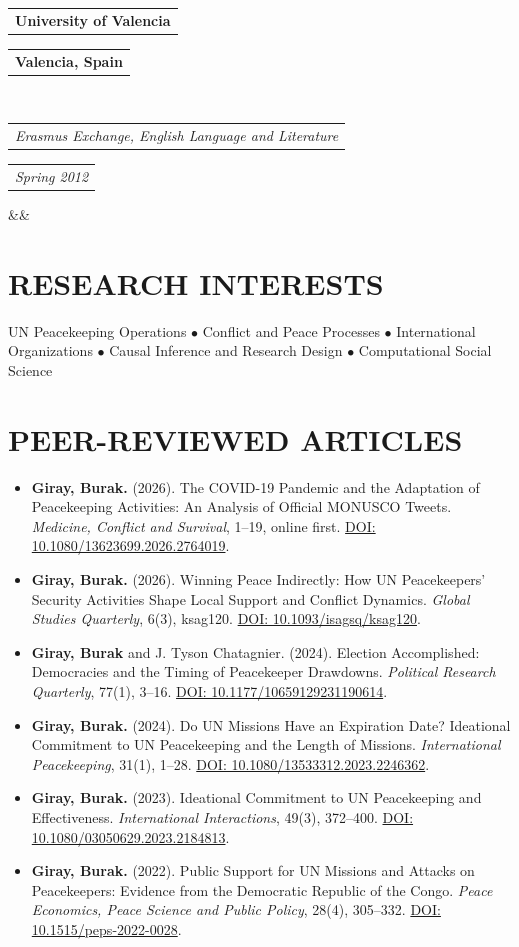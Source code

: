 \documentclass[11pt,a4paper,roman]{moderncv}
\makeatletter
\newcommand*{\customcventry}[7][.25em]{%
  \begin{tabular}{@{}l}{\bfseries #4}\end{tabular}%
  \hfill%
  \begin{tabular}{l@{}}{\bfseries #5}\end{tabular}\\
  \begin{tabular}{@{}l}{\itshape #3}\end{tabular}%
  \hfill%
  \begin{tabular}{l@{}}{\itshape #2}\end{tabular}%
  \ifx&#7&%
  \else{\\%
    \begin{minipage}{\maincolumnwidth}\small#7\end{minipage}}\fi%
  \par\addvspace{#1}}
\makeatother
\begin{document}
\customcventry{Spring 2012}{Erasmus Exchange, English Language and Literature}{University of Valencia}{Valencia, Spain}{}{}

\section{RESEARCH INTERESTS}

UN Peacekeeping Operations $\bullet$ Conflict and Peace Processes $\bullet$ International Organizations $\bullet$ Causal Inference and Research Design $\bullet$ Computational Social Science

\section{PEER-REVIEWED ARTICLES}

\begin{itemize}
  \item \textbf{Giray, Burak.} (2026). The COVID-19 Pandemic and the Adaptation of Peacekeeping Activities: An Analysis of Official MONUSCO Tweets. \textit{Medicine, Conflict and Survival}, 1--19, online first. \href{https://doi.org/10.1080/13623699.2026.2764019}{DOI: 10.1080/13623699.2026.2764019}.
  \item \textbf{Giray, Burak.} (2026). Winning Peace Indirectly: How UN Peacekeepers' Security Activities Shape Local Support and Conflict Dynamics. \textit{Global Studies Quarterly}, 6(3), ksag120. \href{https://doi.org/10.1093/isagsq/ksag120}{DOI: 10.1093/isagsq/ksag120}.
  \item \textbf{Giray, Burak} and J. Tyson Chatagnier. (2024). Election Accomplished: Democracies and the Timing of Peacekeeper Drawdowns. \textit{Political Research Quarterly}, 77(1), 3--16. \href{https://doi.org/10.1177/10659129231190614}{DOI: 10.1177/10659129231190614}.
  \item \textbf{Giray, Burak.} (2024). Do UN Missions Have an Expiration Date? Ideational Commitment to UN Peacekeeping and the Length of Missions. \textit{International Peacekeeping}, 31(1), 1--28. \href{https://doi.org/10.1080/13533312.2023.2246362}{DOI: 10.1080/13533312.2023.2246362}.
  \item \textbf{Giray, Burak.} (2023). Ideational Commitment to UN Peacekeeping and Effectiveness. \textit{International Interactions}, 49(3), 372--400. \href{https://doi.org/10.1080/03050629.2023.2184813}{DOI: 10.1080/03050629.2023.2184813}.
  \item \textbf{Giray, Burak.} (2022). Public Support for UN Missions and Attacks on Peacekeepers: Evidence from the Democratic Republic of the Congo. \textit{Peace Economics, Peace Science and Public Policy}, 28(4), 305--332. \href{https://doi.org/10.1515/peps-2022-0028}{DOI: 10.1515/peps-2022-0028}.
\end{itemize}
\end{document}
